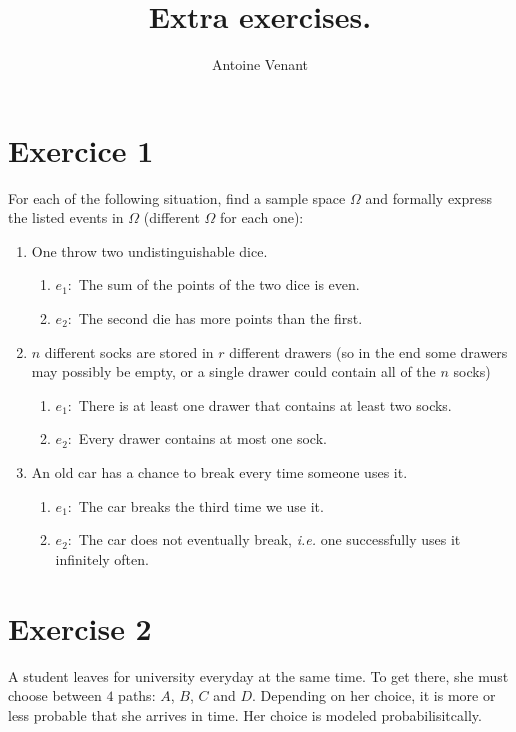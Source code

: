 \documentclass{article}
\title{Extra exercises.}
\author{Antoine Venant}
\begin{document}
\maketitle


\section*{Exercice 1}

For each of the following situation, find a sample space $\Omega$ and formally express the listed events in $\Omega$ (different $\Omega$ for each one):

\begin{enumerate}
\item One throw two undistinguishable dice.
  \begin{enumerate}
  \item $e_1: $ The sum of the points of the two dice is even.
  \item $e_2: $ The second die has more points than the first.
  \end{enumerate}

\item $n$ different socks are stored in $r$ different drawers (so in the end some drawers may possibly be empty, or a single drawer could contain all of the $n$ socks)
  \begin{enumerate}
  \item $e_1: $ There is at least one drawer that contains at least two socks.
  \item $e_2: $ Every drawer contains at most one sock.
  \end{enumerate}
\item An old car has a chance to break every time someone uses it.
  \begin{enumerate}
  \item $e_1: $ The car breaks the third time we use it.
  \item $e_2: $ The car does not eventually break, \emph{i.e.} one successfully uses it infinitely often. 
  \end{enumerate}
\end{enumerate}

\section*{Exercise 2}
A student leaves for university everyday at the same time. To get there, she must choose between $4$ paths: $A$, $B$, $C$ and $D$. Depending on her choice, it is more or less probable that she arrives in time. Her choice is modeled probabilisitcally.
\end{document}
